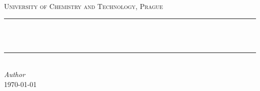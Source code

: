 \makeatletter\begin{titlepage}
    \center
    \textsc{\LARGE University of Chemistry and Technology, Prague}\\[1.5cm]
    \rule{\linewidth}{0.5mm}\\[0.4cm]
    {\huge\bfseries\@title}\\[0.4cm]
    \rule{\linewidth}{0.5mm}\\[1.5cm]
    {\large\textit{Author}}\\\@author
    \vfill\vfill\vfill
    {\large\today}
    \vfill
\end{titlepage}\makeatother
